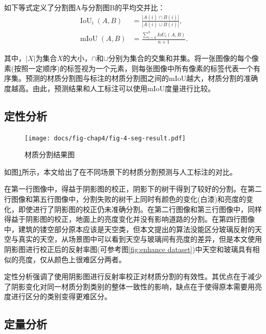 \documentclass[
    type = master, %
    degree = academic,        %
    decl-page,  %
  ]{njuthesis}
\begin{document}
如下等式定义了分割图A与分割图B的平均交并比：
\begin{equation}
\begin{align}
\operatorname{IoU}_i(A,B) &= \frac{|A(i) \cap B(i)|}{|A(i) \cup B(i)|},\\
\operatorname{mIoU}(A,B) &= \frac{\sum_{i=0}^{n} 
 IoU_i(A,B)}{n+1}.
\end{align}
\end{equation}

其中，$|X|$为集合$X$的大小，$\cap$和$\cup$分别为集合的交集和并集。将一张图像的每个像素(按照一定顺序)的标签视为一个元素，则每张图像中所有像素的标签代表一个有序集。预测的材质分割图与标注的材质分割图之间的mIoU越大，材质分割的准确度越高。由此，预测结果和人工标注可以使用mIoU度量进行比较。

\subsection{定性分析}

\begin{figure}
	\centering
	\texttt{[image: docs/fig-chap4/fig-4-seg-result.pdf]}
	\caption{材质分割结果图}
	\label{fig:seg result}
\end{figure}

如图\ref{fig:seg result}所示，本文给出了在不同场景下的材质分割预测与人工标注的对比。

在第一行图像中，得益于阴影图的校正，阴影下的树干得到了较好的分割。在第二行图像和第五行图像中，分割失败的树干上同时有颜色的变化(白漆)和亮度的变化，即使进行了阴影图的校正仍未准确分割。在第二行图像和第三行图像中，同样得益于阴影图的校正，地面上的亮度变化并没有影响道路的分割。在第四行图像中，建筑的镂空部分原本应该是天空类，但本文提出的算法没能区分玻璃反射的天空与真实的天空，从场景图中可以看到天空与玻璃间有亮度的差异，但是本文使用阴影图进行校正后的反射率图(可参考图\ref{fig:enhance dataset})中天空和玻璃具有相似的亮度，仅从颜色上很难区分两者。

定性分析强调了使用阴影图进行反射率校正对材质分割的有效性。其优点在于减少了阴影变化对同一材质分割类别的整体一致性的影响，缺点在于使得原本需要用亮度进行区分的类别变得更难区分。


\subsection{定量分析}
\end{document}
